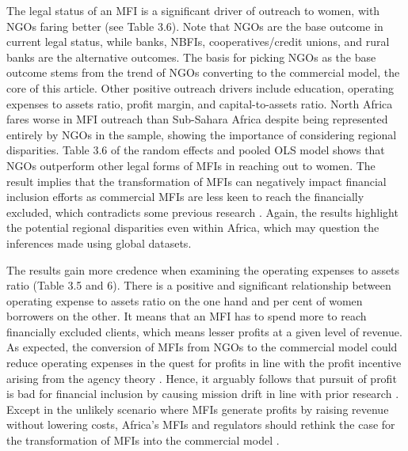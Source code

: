 \documentclass[a4paper, nobind]{templates/ociamthesis}
\begin{document}
The legal status of an MFI is a significant driver of outreach to women, with NGOs faring better (see Table 3.6). Note that NGOs are the base outcome in current legal status, while banks, NBFIs, cooperatives/credit unions, and rural banks are the alternative outcomes. The basis for picking NGOs as the base outcome stems from the trend of NGOs converting to the commercial model, the core of this article. Other positive outreach drivers include education, operating expenses to assets ratio, profit margin, and capital-to-assets ratio. North Africa fares worse in MFI outreach than Sub-Sahara Africa despite being represented entirely by NGOs in the sample, showing the importance of considering regional disparities. Table 3.6 of the random effects and pooled OLS model shows that NGOs outperform other legal forms of MFIs in reaching out to women. The result implies that the transformation of MFIs can negatively impact financial inclusion efforts as commercial MFIs are less keen to reach the financially excluded, which contradicts some previous research \autocite{ledgerwood1998microfinance,ledgerwood2006transforming,hartarska2012governance,bos2015practice}. Again, the results highlight the potential regional disparities even within Africa, which may question the inferences made using global datasets.

The results gain more credence when examining the operating expenses to assets ratio (Table 3.5 and 6). There is a positive and significant relationship between operating expense to assets ratio on the one hand and per cent of women borrowers on the other. It means that an MFI has to spend more to reach financially excluded clients, which means lesser profits at a given level of revenue. As expected, the conversion of MFIs from NGOs to the commercial model could reduce operating expenses in the quest for profits in line with the profit incentive arising from the agency theory \autocite{eisenhardt1989agency}. Hence, it arguably follows that pursuit of profit is bad for financial inclusion by causing mission drift in line with prior research \autocite{wagenaar2012institutional,roberts2013profit,lopatta2016microfinance,mia2017mission}. Except in the unlikely scenario where MFIs generate profits by raising revenue without lowering costs, Africa's MFIs and regulators should rethink the case for the transformation of MFIs into the commercial model \autocite{sun2021globalization}.
\end{document}

